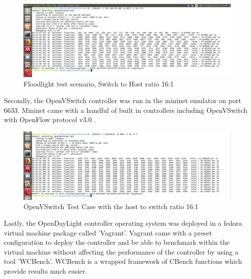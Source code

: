 \begin{figure}[!hbt]
        \centering
        \includegraphics[width=\textwidth,height=0.5\textwidth]{images/FL-TP-16-to-1.png}
        \caption{Floodlight test scenario, Switch to Host ratio 16:1}
        \label{flrun}
\end{figure}

Secondly, the OpenVSwitch controller was run in the mininet emulator on port 6633. Mininet came with a handful of built in controllers including OpenVSwitch with OpenFlow protocol v3.0 .

\begin{figure}[!hbt]
        \centering
        \includegraphics[width=\textwidth,height=0.5\textwidth]{images/OVS-TP-16-to-1.png}
        \caption{OpenVSwitch Test Case with the host to switch ratio 16:1}
        \label{ovsrun}
\end{figure} 

Lastly, the OpenDayLight controller operating system was deployed in a fedora virtual machine package called 'Vagrant'. Vagrant came with a preset configuration to deploy the controller and be able to benchmark within the virtual machine without affecting the performance of the controller by using a tool 'WCBench'. WCBench is a wrapped framework of CBench functions which provide results much easier.

